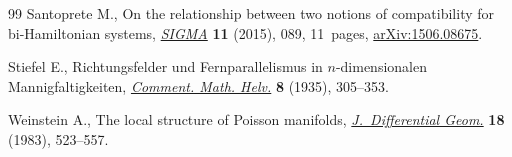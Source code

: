 \documentclass[pdftex]{sigma}
\numberwithin{equation}{section}
\begin{document}
\begin{thebibliography}{99}
Santoprete M., On the relationship between two notions of compatibility for
 bi-{H}amiltonian systems, \href{https://doi.org/10.3842/SIGMA.2015.089}{\textit{SIGMA}} \textbf{11} (2015), 089, 11~pages,
 \href{https://arxiv.org/abs/1506.08675}{arXiv:1506.08675}.

Stiefel E., Richtungsfelder und {F}ernparallelismus in $n$-dimensionalen
 {M}annigfaltigkeiten, \href{https://doi.org/10.1007/BF01199559}{\textit{Comment. Math. Helv.}} \textbf{8} (1935), 305--353.

Weinstein A., The local structure of {P}oisson manifolds,
 \href{https://doi.org/10.4310/jdg/1214437787}{\textit{J.~Differential Geom.}} \textbf{18} (1983), 523--557.

\end{thebibliography}\LastPageEnding
\end{document}
